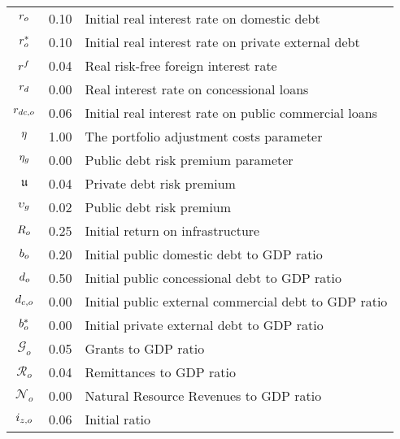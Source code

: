 \documentclass[11pt]{article}
\begin{document}
\begin{center}
\begin{tabular}{ccc}
\\ 
${\small r}_{o}$ & {\small 0.10} & \multicolumn{1}{l}{\small Initial real
interest rate on domestic debt} \\ 
${\small r}_{o}^{\ast }$ & {\small 0.10} & \multicolumn{1}{l}{\small Initial
real interest rate on private external debt} \\ 
${\small r}^{f}$ & {\small 0.04} & \multicolumn{1}{l}{\small Real risk-free
foreign interest rate} \\ 
${\small r}_{d}$ & {\small 0.00} & \multicolumn{1}{l}{\small Real interest
rate on concessional loans} \\ 
${\small r}_{dc,o}$ & {\small 0.06} & \multicolumn{1}{l}{\small Initial real
interest rate on public commercial loans} \\ 
${\small \eta }$ & {\small 1.00} & \multicolumn{1}{l}{\small The portfolio
adjustment costs parameter} \\ 
${\small \eta }_{g}$ & {\small 0.00} & \multicolumn{1}{l}{\small Public debt
risk premium parameter} \\ 
$\mathfrak{u}$ & {\small 0.04} & \multicolumn{1}{l}{\small Private debt risk
premium} \\ 
${\small \upsilon }_{g}$ & {\small 0.02} & \multicolumn{1}{l}{\small Public
debt risk premium} \\ 
${\small R}_{{\small o}}$ & {\small 0.25} & \multicolumn{1}{l}{{\small %
Initial} {\small return on infrastructure}} \\ 
${\small b}_{o}$ & {\small 0.20} & \multicolumn{1}{l}{\small Initial public
domestic debt to GDP ratio} \\ 
${\small d}_{o}$ & {\small 0.50} & \multicolumn{1}{l}{\small Initial public
concessional debt to GDP ratio} \\ 
${\small d}_{c,o}$ & {\small 0.00} & \multicolumn{1}{l}{\small Initial
public external commercial debt to GDP ratio} \\ 
${\small b}_{o}^{\ast }$ & {\small 0.00} & \multicolumn{1}{l}{\small Initial
private external debt to GDP ratio} \\ 
$\mathcal{G}_{o}$ & {\small 0.05} & \multicolumn{1}{l}{\small Grants to GDP
ratio} \\ 
$\mathcal{R}_{o}$ & {\small 0.04} & \multicolumn{1}{l}{\small Remittances to
GDP ratio} \\ 
$\mathcal{N}_{o}$ & {\small 0.00} & \multicolumn{1}{l}{\small Natural
Resource Revenues to GDP ratio} \\ 
${\small i}_{z,o}$ & {\small 0.06} & \multicolumn{1}{l}{\small Initial ratio
}
\end{tabular}
\end{center}
\end{document}
